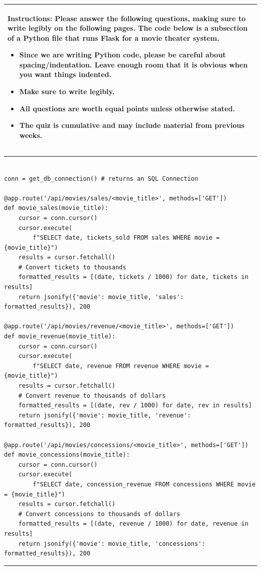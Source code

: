 \documentclass[11pt]{article}
\begin{document}
\begin{table}[h]
\centering
{} %
\begin{tabular}{|p{\textwidth}|}
\hline
\begin{minipage}[t]{\textwidth}
\vspace{0pt}  %
\noindent \textbf{Instructions:} Please answer the following questions, making sure to write legibly on the following pages. The code below is a subsection of a Python file that runs Flask for a movie theater system.
\begin{itemize}
\item Since we are writing Python code, please be careful about spacing/indentation. Leave enough room that it is obvious when you want things indented. 
\item Make sure to write legibly.
\item All questions are worth equal points unless otherwise stated.
\item The quiz is cumulative and may include material from previous weeks.
\end{itemize}
\end{minipage} 
\\
\hline
\end{tabular}
\end{table}

{\color{lightgray}\hrule}
\begin{verbatim}

conn = get_db_connection() # returns an SQL Connection

@app.route('/api/movies/sales/<movie_title>', methods=['GET'])
def movie_sales(movie_title):
    cursor = conn.cursor()
    cursor.execute(
        f"SELECT date, tickets_sold FROM sales WHERE movie = {movie_title}")
    results = cursor.fetchall()
    # Convert tickets to thousands
    formatted_results = [(date, tickets / 1000) for date, tickets in results]
    return jsonify({'movie': movie_title, 'sales': formatted_results}), 200

@app.route('/api/movies/revenue/<movie_title>', methods=['GET'])
def movie_revenue(movie_title):
    cursor = conn.cursor()
    cursor.execute(
        f"SELECT date, revenue FROM revenue WHERE movie = {movie_title}")
    results = cursor.fetchall()
    # Convert revenue to thousands of dollars
    formatted_results = [(date, rev / 1000) for date, rev in results]
    return jsonify({'movie': movie_title, 'revenue': formatted_results}), 200

@app.route('/api/movies/concessions/<movie_title>', methods=['GET'])
def movie_concessions(movie_title):
    cursor = conn.cursor()
    cursor.execute(
        f"SELECT date, concession_revenue FROM concessions WHERE movie = {movie_title}")
    results = cursor.fetchall()
    # Convert concessions to thousands of dollars
    formatted_results = [(date, revenue / 1000) for date, revenue in results]
    return jsonify({'movie': movie_title, 'concessions': formatted_results}), 200

\end{verbatim}
{\color{lightgray}\hrule}
\end{document}
